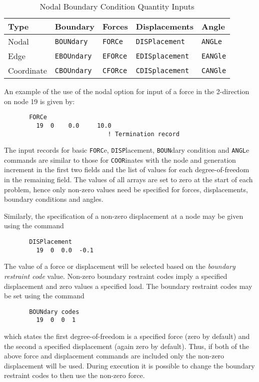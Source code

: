 \begin{table}[ht!]
\begin{center}
\begin{tabular}{| l | l | l | l | l |} \hline
Type &  Boundary & Forces & Displacements & Angle \\
\hline Nodal & {\tt BOUNdary} & {\tt FORCe} & {\tt DISPlacement} & {\tt ANGLe}\\
Edge    & {\tt EBOUndary} & {\tt EFORce} & {\tt EDISplacement} & {\tt EANGle} \\
Coordinate & {\tt CBOUndary} & {\tt CFORce} & {\tt CDISplacement} & {\tt CANGle} \\
\hline
\end{tabular}
\end{center}
\caption{Nodal Boundary Condition Quantity Inputs}
\label{tab111}
\end{table}
An example of the use of the nodal option for input of a force in the
2-direction on node 19 is given by:
\begin{verbatim}
       FORCe
         19  0    0.0     10.0
                             ! Termination record
\end{verbatim}
The input records for basic {\tt FORC}e, {\tt DISP}\-lacement, {\tt BOUN}d\-ary
condition and {\tt ANGL}e
commands are similar to those for {\tt COOR}\-inates
with the node and generation increment in the first two fields and the list
of values for each degree-of-freedom in the remaining field.  The values of
all arrays are set to zero at the start of each problem, hence only non-zero
values need be specified for forces, displacements, boundary conditions and
angles.

Similarly, the specification of a non-zero displacement at a node may be given
using the command
\begin{verbatim}
       DISPlacement
	     19  0  0.0  -0.1
\end{verbatim}
The value of a force or displacement will be selected based on the {\it
boundary restraint code} value.  Non-zero boundary restraint codes imply
a specified displacement and zero values a specified load.  The boundary
restraint codes may be set using the command
\begin{verbatim}
       BOUNdary codes
	     19  0  0  1
\end{verbatim}
which states the first degree-of-freedom is a specified force (zero by
default) and the second a specified displacement (again zero by default).
Thus, if both of the above force and displacement commands are included
only the non-zero displacement will be used.  During execution it is possible
to change the boundary restraint codes to then use the non-zero force.

